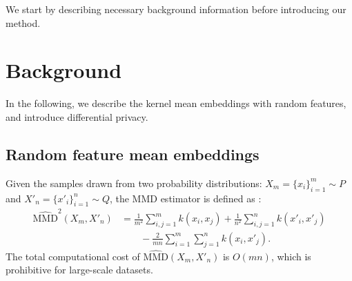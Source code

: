 \documentclass{article}
\begin{document}
We start by describing necessary background information before introducing our method. 

\section{Background}

In the following, we describe the kernel mean embeddings with random features, and introduce differential privacy. 

\subsection{Random feature mean embeddings}\label{subsec:RFME}


Given the samples drawn from two probability distributions: $X_{m}=\{x_{i}\}_{i=1}^{m} \sim P$ and $X'_{n}=\{x'_{i}\}_{i=1}^{n} \sim Q$, the MMD estimator is defined as   \cite{Gretton2012}:
\begin{align}\label{eq:MMD_full}
 \widehat{\mathrm{MMD}}^2(X_{m},X'_{n}) &= \tfrac{1}{m^2}\sum_{i,j=1}^{m}k(x_{i},x_{j}) +\tfrac{1}{n^2}\sum_{i,j=1}^{n}k(x'_{i},x'_{j}) \nonumber \\
 & \qquad -\tfrac{2}{mn}\sum_{i=1}^{m}\sum_{j=1}^{n}k(x_{i},x'_{j}).
\end{align}
%
%
The total computational cost of $
\widehat{\mathrm{MMD}}(X_{m},X'_{n}) $ is $O(mn)$, which is prohibitive for large-scale datasets. 
%
%
\end{document}
